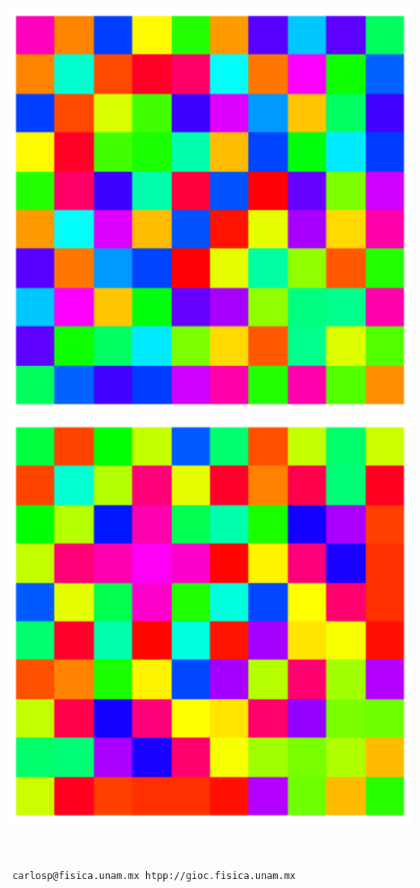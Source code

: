 \documentclass[pdftex,12pt, letterpaper]{report}
\begin{document}
\begin{titlepage}
\begin{center}
\begin{minipage}[c]{\adios}
\includegraphics[width=.48\textwidth]{RM3}\hfill\includegraphics[width=.48\textwidth]{RM4}
\end{minipage}\\[2cm]

\large 

\end{center}
\vfill

\texttt{
carlosp@fisica.unam.mx \hfill htpp://gioc.fisica.unam.mx
}
\end{titlepage}
\end{document}
